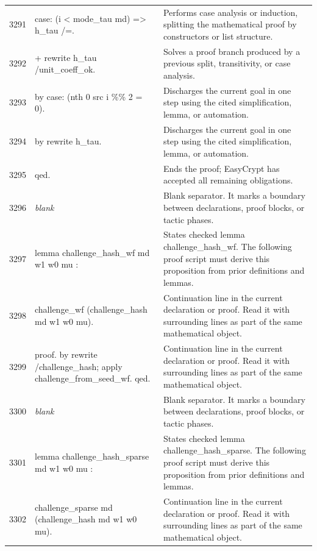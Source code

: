 \documentclass[10pt]{article}
\begin{document}
\begin{longtable}{r L{0.53\textwidth} L{0.37\textwidth}}
3291 & {\ttfamily\scriptsize case: (i < mode\_tau md) => h\_tau /=.} & Performs case analysis or induction, splitting the mathematical proof by constructors or list structure. \\
3292 & {\ttfamily\scriptsize + rewrite h\_tau /unit\_coeff\_ok.} & Solves a proof branch produced by a previous split, transitivity, or case analysis. \\
3293 & {\ttfamily\scriptsize   by case: (nth 0 src i \%\% 2 = 0).} & Discharges the current goal in one step using the cited simplification, lemma, or automation. \\
3294 & {\ttfamily\scriptsize by rewrite h\_tau.} & Discharges the current goal in one step using the cited simplification, lemma, or automation. \\
3295 & {\ttfamily\scriptsize qed.} & Ends the proof; EasyCrypt has accepted all remaining obligations. \\
3296 & {\ttfamily\scriptsize \emph{blank}} & Blank separator.  It marks a boundary between declarations, proof blocks, or tactic phases. \\
3297 & {\ttfamily\scriptsize lemma challenge\_hash\_wf md w1 w0 mu :} & States checked lemma challenge\_hash\_wf.  The following proof script must derive this proposition from prior definitions and lemmas. \\
3298 & {\ttfamily\scriptsize   challenge\_wf (challenge\_hash md w1 w0 mu).} & Continuation line in the current declaration or proof.  Read it with surrounding lines as part of the same mathematical object. \\
3299 & {\ttfamily\scriptsize proof. by rewrite /challenge\_hash; apply challenge\_from\_seed\_wf. qed.} & Continuation line in the current declaration or proof.  Read it with surrounding lines as part of the same mathematical object. \\
3300 & {\ttfamily\scriptsize \emph{blank}} & Blank separator.  It marks a boundary between declarations, proof blocks, or tactic phases. \\
3301 & {\ttfamily\scriptsize lemma challenge\_hash\_sparse md w1 w0 mu :} & States checked lemma challenge\_hash\_sparse.  The following proof script must derive this proposition from prior definitions and lemmas. \\
3302 & {\ttfamily\scriptsize   challenge\_sparse md (challenge\_hash md w1 w0 mu).} & Continuation line in the current declaration or proof.  Read it with surrounding lines as part of the same mathematical object. \\

\end{longtable}
\end{document}

